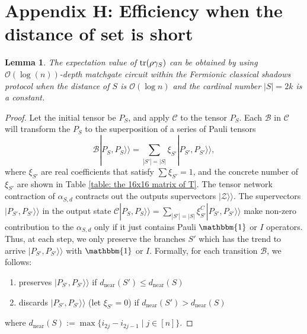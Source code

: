 \documentclass[journal=jctcce,a4paper,manuscript=article]{achemso}
\newtheorem{lemma}{Lemma}
\newcommand{\supket}[1]{|#1 \rangle\rangle}
\begin{document}
\section{Appendix H: Efficiency when the distance of set is short}
\label{appendix efficiency}
\begin{lemma}
  \label{lemma: 7}
  The expectation value of $\tr(\rho \gamma_S)$ can be obtained by using $\mathcal{O}(\log(n))$-depth matchgate circuit within the Fermionic classical shadows protocol when the distance of $S$ is $\mathcal{O}(\log n)$ and the cardinal number $|S| = 2k$ is a constant.
\end{lemma}

\begin{proof}
  Let the initial tensor be $P_S$, and apply $\mathcal{C}$ to the tensor $P_S$. Each $\mathcal{B}$ in $\mathcal{C}$ will transform the $P_S$ to the superposition of a series of Pauli tensors
  \begin{equation}
    \mathcal{B} \supket{P_{S}, P_{S}} = \sum_{|S'| = |S|} \xi_{S'} \supket{P_{S'}, P_{S'}},
  \end{equation}
  where $\xi_{S'}$ are real coefficients that satisfy $\sum \xi_{S'} = 1$, and the concrete number of $\xi_{S'}$ are shown in Table \ref{table: the 16x16 matrix of T}.
  The tensor network contraction of $\alpha_{S,d}$ contracts out the
  outputs supervectors $ \supket{\mathcal{Z}}$. The supervectors $\supket{P_{S'}, P_{S'}}$ in the output state $\mathcal{C} \supket{P_{S}, P_{S}} = \sum_{|S'| = |S|} \xi_{S'}^{C} \supket{P_{S'}, P_{S'}}$ make non-zero contribution to the $\alpha_{S,d}$ only if it just contains Pauli $\mathbbm{1}$ or $I$ operators. Thus, at each step, we only preserve the branches $S'$ which has the trend to arrive $\supket{P_{S'}, P_{S'}}$ with $\mathbbm{1}$ or $I$. Formally, for each transition $\mathcal{B}$, we follows:
  \begin{enumerate}
    \item preserves $\supket{P_{S'}, P_{S'}}$ if $d_\text{near}(S')\leq d_\text{near}(S)$
    \item discards $\supket{P_{S'}, P_{S'}}$ (let $\xi_{S'} = 0$) if $d_\text{near}(S')>
            d_\text{near}(S)$
  \end{enumerate}
  where $d_\text{near}(S):= \max\{ i_{2j} - i_{2j-1} \mid j \in [n] \}$.


\end{proof}
\end{document}
